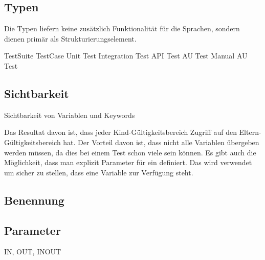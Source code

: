 \todo

\subsection{Typen}
\label{cha:KeywordTypes}

Die Typen liefern keine zusätzlich Funktionalität für die Sprachen, sondern dienen primär als Strukturierungselement.

TestSuite
TestCase
Unit Test
Integration Test
API Test
AU Test
Manual AU Test

\todo

\subsection{Sichtbarkeit}
\label{cha:KeywordScope}

Sichtbarkeit von Variablen und Keywords

\todo

 Das Resultat davon ist, dass jeder Kind-Gültigkeitsbereich Zugriff auf den Eltern-Gültigkeitsbereich hat. Der Vorteil davon ist, dass nicht alle Variablen übergeben werden müssen, da dies bei einem Test schon viele sein können. Es gibt auch die Möglichkeit, dass man explizit Parameter für ein  definiert. Das wird verwendet um sicher zu stellen, dass eine Variable zur Verfügung steht.

\subsection{Benennung}
 
\todo 

\subsection{Parameter}

IN, OUT, INOUT

\todo



